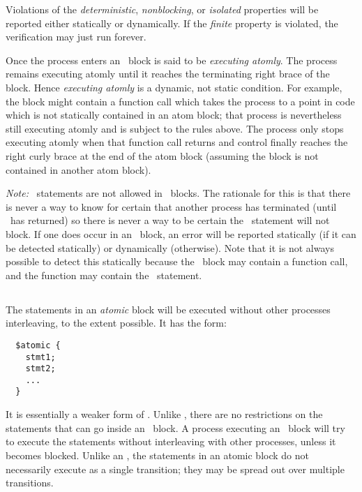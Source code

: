 Violations of the \emph{deterministic}, \emph{nonblocking}, or
\emph{isolated} properties will be reported either statically or
dynamically.  If the \emph{finite} property is violated, the
verification may just run forever.

Once the process enters an \catom\ block is said to be \emph{executing
  atomly}.  The process remains executing atomly until it reaches the
terminating right brace of the block.  Hence \emph{executing atomly}
is a dynamic, not static condition.  For example, the block might
contain a function call which takes the process to a point in code
which is not statically contained in an atom block; that process is
nevertheless still executing atomly and is subject to the rules above.
The process only stops executing atomly when that function call
returns and control finally reaches the right curly brace at the end
of the atom block (assuming the block is not contained in another atom
block).

\emph{Note:} \cwait\ statements are not allowed in \catom\ blocks.
The rationale for this is that there is never a way to know for
certain that another process has terminated (until \cwait\ has
returned) so there is never a way to be certain the \cwait\ statement
will not block.  If one does occur in an \catom\ block, an error will
be reported statically (if it can be detected statically) or
dynamically (otherwise).  Note that it is not always possible to
detect this statically because the \catom\ block may contain a
function call, and the function may contain the \cwait\ statement.

\subsection{\catomic} The statements in an \emph{atomic} block
will be executed without other processes interleaving, to
the extent possible.  It has the form:
\begin{verbatim}
  $atomic {
    stmt1;
    stmt2;
    ...
  }
\end{verbatim}
It is essentially a weaker form of \catom.  Unlike \catom, there are
no restrictions on the statements that can go inside an \catomic\
block.  A process executing an \catomic~block will try to execute the
statements without interleaving with other processes, unless it
becomes blocked.  Unlike an \catom, the statements in an atomic block
do not necessarily execute as a single transition; they may be spread
out over multiple transitions.

